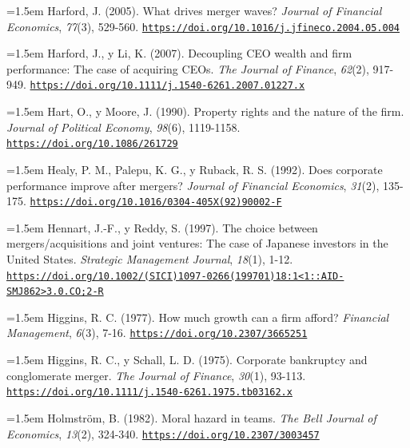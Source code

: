 \documentclass[10pt,a4paper]{article}
\begin{document}
\noindent\hangindent=1.5em Harford, J. (2005). What drives merger waves? \textit{Journal of Financial Economics}, \textit{77}(3), 529-560. \href{https://doi.org/10.1016/j.jfineco.2004.05.004}{\nolinkurl{https://doi.org/10.1016/j.jfineco.2004.05.004}}

\noindent\hangindent=1.5em Harford, J., y Li, K. (2007). Decoupling CEO wealth and firm performance: The case of acquiring CEOs. \textit{The Journal of Finance}, \textit{62}(2), 917-949. \href{https://doi.org/10.1111/j.1540-6261.2007.01227.x}{\nolinkurl{https://doi.org/10.1111/j.1540-6261.2007.01227.x}}

\noindent\hangindent=1.5em Hart, O., y Moore, J. (1990). Property rights and the nature of the firm. \textit{Journal of Political Economy}, \textit{98}(6), 1119-1158. \href{https://doi.org/10.1086/261729}{\nolinkurl{https://doi.org/10.1086/261729}}

\noindent\hangindent=1.5em Healy, P. M., Palepu, K. G., y Ruback, R. S. (1992). Does corporate performance improve after mergers? \textit{Journal of Financial Economics}, \textit{31}(2), 135-175. \href{https://doi.org/10.1016/0304-405X(92)90002-F}{\nolinkurl{https://doi.org/10.1016/0304-405X(92)90002-F}}

\noindent\hangindent=1.5em Hennart, J.-F., y Reddy, S. (1997). The choice between mergers/acquisitions and joint ventures: The case of Japanese investors in the United States. \textit{Strategic Management Journal}, \textit{18}(1), 1-12. \href{https://doi.org/10.1002/(SICI)1097-0266(199701)18:1<1::AID-SMJ862>3.0.CO;2-R}{\nolinkurl{https://doi.org/10.1002/(SICI)1097-0266(199701)18:1<1::AID-SMJ862>3.0.CO;2-R}}

\noindent\hangindent=1.5em Higgins, R. C. (1977). How much growth can a firm afford? \textit{Financial Management}, \textit{6}(3), 7-16. \href{https://doi.org/10.2307/3665251}{\nolinkurl{https://doi.org/10.2307/3665251}}

\noindent\hangindent=1.5em Higgins, R. C., y Schall, L. D. (1975). Corporate bankruptcy and conglomerate merger. \textit{The Journal of Finance}, \textit{30}(1), 93-113. \href{https://doi.org/10.1111/j.1540-6261.1975.tb03162.x}{\nolinkurl{https://doi.org/10.1111/j.1540-6261.1975.tb03162.x}}

\noindent\hangindent=1.5em Holmström, B. (1982). Moral hazard in teams. \textit{The Bell Journal of Economics}, \textit{13}(2), 324-340. \href{https://doi.org/10.2307/3003457}{\nolinkurl{https://doi.org/10.2307/3003457}}
\end{document}
